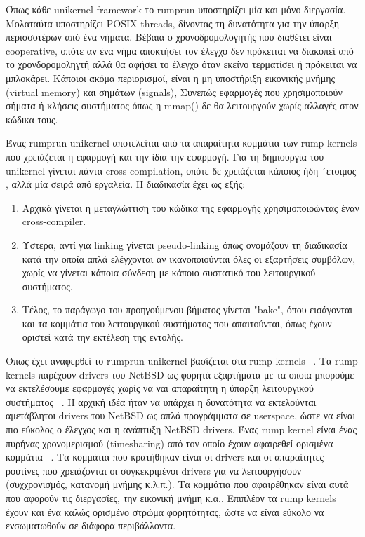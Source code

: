 Όπως κάθε unikernel framework το rumprun υποστηρίζει μία και μόνο διεργασία.
Μολαταύτα υποστηρίζει POSIX threads, δίνοντας τη δυνατότητα για την ύπαρξη
περισσοτέρων από ένα νήματα. Βέβαια ο χρονοδρομολογητής που διαθέτει είναι
cooperative, οπότε αν ένα νήμα αποκτήσει τον έλεγχο δεν πρόκειται να διακοπεί
από το χρονδορομοληγτή αλλά θα αφήσει το έλεγχο όταν εκείνο τερματίσει ή
πρόκειται να μπλοκάρει. Κάποιοι ακόμα περιορισμοί, είναι η μη υποστήριξη
εικονικής μνήμης (virtual memory) και σημάτων (signals), Συνεπώς εφαρμογές που
χρησιμοποιούν σήματα ή κλήσεις συστήματος όπως η mmap() δε θα λειτουργούν χωρίς αλλαγές στον κώδικα τους.

Ένας rumprun unikernel αποτελείται από τα απαραίτητα κομμάτια των rump kernels
που χρειάζεται η εφαρμογή και την ίδια την εφαρμογή. Για τη δημιουργία του
unikernel γίνεται πάντα cross-compilation, οπότε δε χρειάζεται κάποιος ήδη
´ετοιμος , αλλά μία σειρά από εργαλεία. H διαδικασία έχει ως
εξής:
\begin{enumerate}
	\item Αρχικά γίνεται η μεταγλώττιση του κώδικα της εφαρμογής
		χρησιμοποιοώντας έναν cross-compiler.
	\item Ύστερα, αντί για linking γίνεται pseudo-linking όπως ονομάζουν τη
		διαδικασία κατά την οποία απλά ελέγχονται αν ικανοποιούνται όλες
		οι εξαρτήσεις συμβόλων, χωρίς να γίνεται κάποια σύνδεση με
		κάποιο συστατικό του λειτουργικού συστήματος.
	\item Τέλος, το παράγωγο του προηγούμενου βήματος γίνεται "bake", όπου
		εισάγονται και τα κομμάτια του λειτουργικού συστήματος που
		απαιτούνται, όπως έχουν οριστεί κατά την εκτέλεση της εντολής.
\end{enumerate}

Όπως έχει αναφερθεί το rumprun unikernel βασίζεται στα rump kernels
~\cite{rumprun_Xen}. Τα rump kernels παρέχουν drivers του NetBSD ως φορητά
εξαρτήματα με τα οποία μπορούμε να εκτελέσουμε εφαρμογές χωρίς να ναι απαραίτητη η
ύπαρξη λειτουργικού συστήματος ~\cite{kantee2014rump}. Η αρχική ιδέα ήταν να
υπάρχει η δυνατότητα να εκτελούνται αμετάβλητοι drivers του NetBSD ως απλά
προγράμματα σε userspace, ώστε να είναι πιο εύκολος ο έλεγχος και η ανάπτυξη
NetBSD drivers. Ένας rump kernel είναι ένας πυρήνας χρονομερισμού (timesharing)
από τον οποίο έχουν αφαιρεθεί ορισμένα κομμάτια ~\cite{kantee2012design}. Τα
κομμάτια που κρατήθηκαν είναι οι drivers και οι απαραίτητες ρουτίνες που
χρειάζονται οι συγκεκριμένοι drivers για να λειτουργήσουν (συχχρονισμός,
κατανομή μνήμης κ.λ.π.). Τα κομμάτια που αφαιρέθηκαν είναι αυτά που αφορούν τις
διεργασίες, την εικονική μνήμη κ.α.. Επιπλέον τα rump kernels έχουν και ένα
καλώς ορισμένο στρώμα φορητότητας, ώστε να είναι εύκολο να ενσωματωθούν σε
διάφορα περιβάλλοντα.

